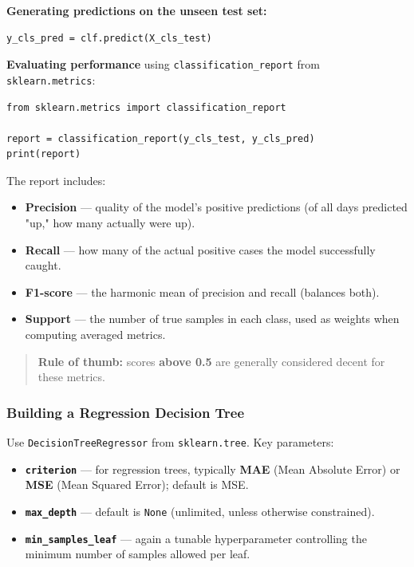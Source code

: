 \documentclass[12pt,openany]{book}
\begin{document}
\textbf{Generating predictions on the unseen test set:}

\begin{Verbatim}[breaklines=true,fontsize=\small]
y_cls_pred = clf.predict(X_cls_test)
\end{Verbatim}


\textbf{Evaluating performance} using \texttt{classification\_report} from \texttt{sklearn.metrics}:

\begin{Verbatim}[breaklines=true,fontsize=\small]
from sklearn.metrics import classification_report

report = classification_report(y_cls_test, y_cls_pred)
print(report)
\end{Verbatim}


The report includes:
\begin{itemize}[leftmargin=*]
    \item \textbf{Precision} --- quality of the model's positive predictions (of all days predicted "up," how many actually were up).
    \item \textbf{Recall} --- how many of the actual positive cases the model successfully caught.
    \item \textbf{F1-score} --- the harmonic mean of precision and recall (balances both).
    \item \textbf{Support} --- the number of true samples in each class, used as weights when computing averaged metrics.

\end{itemize}

\begin{quote}
\textbf{Rule of thumb:} scores \textbf{above 0.5} are generally considered decent for these metrics.
\end{quote}


\subsubsection{Building a Regression Decision Tree}


Use \texttt{DecisionTreeRegressor} from \texttt{sklearn.tree}. Key parameters:

\begin{itemize}[leftmargin=*]
    \item \textbf{\texttt{criterion}} --- for regression trees, typically \textbf{MAE} (Mean Absolute Error) or \textbf{MSE} (Mean Squared Error); default is MSE.
    \item \textbf{\texttt{max\_depth}} --- default is \texttt{None} (unlimited, unless otherwise constrained).
    \item \textbf{\texttt{min\_samples\_leaf}} --- again a tunable hyperparameter controlling the minimum number of samples allowed per leaf.
\end{itemize}
\end{document}
